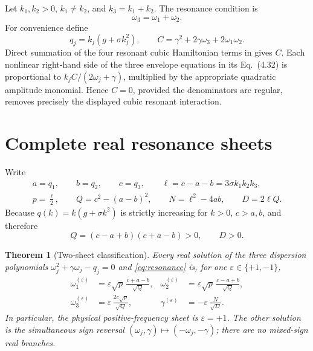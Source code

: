 \documentclass[11pt]{article}
\newtheorem{theorem}{Theorem}
\theoremstyle{remark}
\begin{document}
Let \(k_1,k_2>0\), \(k_1\neq k_2\), and \(k_3=k_1+k_2\). The resonance
condition is
\begin{equation}
  \omega_3=\omega_1+\omega_2.                   \label{eq:resonance}
\end{equation}
For convenience define
\begin{equation}
  q_j=k_j(g+\sigma k_j^2),\qquad
  C=\gamma^2+2\gamma\omega_3+2\omega_1\omega_2. \label{eq:Cdef}
\end{equation}
Direct summation of the four resonant cubic Hamiltonian terms in
\cite[Eq.~(4.31)]{IvanovMartin2019} gives \(C\). Each nonlinear right-hand
side of the three envelope equations in its Eq.~(4.32) is proportional to
\(k_j C/(2\omega_j+\gamma)\), multiplied by the appropriate quadratic
amplitude monomial. Hence \(C=0\), provided the denominators are regular,
removes precisely the displayed cubic resonant interaction.

\section{Complete real resonance sheets}

Write
\begin{equation}
\begin{gathered}
 a=q_1,\qquad b=q_2,\qquad c=q_3,\qquad
 \ell=c-a-b=3\sigma k_1k_2k_3,\\
 p=\frac{\ell}{2},\qquad
 Q=c^2-(a-b)^2,\qquad
 N=\ell^2-4ab,\qquad D=2\ell Q.                 \label{eq:invariants}
\end{gathered}
\end{equation}
Because \(q(k)=k(g+\sigma k^2)\) is strictly increasing for \(k>0\),
\(c>a,b\), and therefore
\[
 Q=(c-a+b)(c+a-b)>0,\qquad D>0.
\]

\begin{theorem}[Two-sheet classification]\label{thm:sheets}
Every real solution of the three dispersion polynomials
\(\omega_j^2+\gamma\omega_j-q_j=0\) and
\eqref{eq:resonance} is, for one
\(\varepsilon\in\{+1,-1\}\),
\begin{equation}
\begin{aligned}
 \omega_1^{(\varepsilon)}
   &=\varepsilon\sqrt{p}\,\frac{c+a-b}{\sqrt Q},&
 \omega_2^{(\varepsilon)}
   &=\varepsilon\sqrt{p}\,\frac{c-a+b}{\sqrt Q},\\
 \omega_3^{(\varepsilon)}
   &=\varepsilon\,\frac{2c\sqrt p}{\sqrt Q},&
 \gamma^{(\varepsilon)}
   &=-\varepsilon\,\frac{N}{\sqrt D}.
                                                        \label{eq:sheets}
\end{aligned}
\end{equation}
In particular, the physical positive-frequency sheet is
\(\varepsilon=+1\). The other solution is the simultaneous sign reversal
\((\omega_j,\gamma)\mapsto(-\omega_j,-\gamma)\); there are no mixed-sign
real branches.
\end{theorem}
\end{document}
